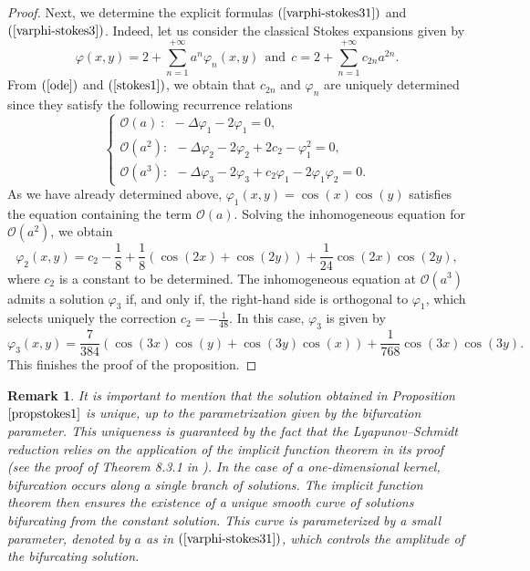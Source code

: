\documentclass[12pt,reqno,a4paper]{amsart} %
\numberwithin{equation}{section}
\numberwithin{figure}{section}
\newtheorem{remark}[theorem]{Remark}
\begin{document}
\begin{proof}
			 Next, we determine the explicit formulas $(\ref{varphi-stokes31})$ and $(\ref{varphi-stokes3})$. Indeed, let us consider the classical Stokes expansions given by
			 \begin{equation}\label{stokes1}\varphi(x,y) =2+\sum_{n=1}^{+\infty}a^n\varphi_n(x,y)\ \ \mbox{and}\ \ c = 2+ \sum_{n=1}^{+\infty}c_{2n}a^{2n}.\end{equation}
			 From $(\ref{ode})$ and $(\ref{stokes1})$, we obtain that $c_{2n}$ and $\varphi_n$ are uniquely determined since they satisfy the following recurrence relations
			 \begin{equation}\label{recurrence}\left\{\begin{array}{llllll}
			 	\mathcal{O}(a)\ :\ \ -\Delta\varphi_1-2\varphi_1=0,\\
			 	\mathcal{O}(a^2):\ \ - \Delta \varphi_2-2\varphi_2+2c_2-\varphi_1^2=0,\\
			 	\mathcal{O}(a^3):\ \ -\Delta\varphi_3-2\varphi_3+c_2\varphi_1-2\varphi_1\varphi_2=0.
			 	\end{array}\right.\end{equation}
			\indent As we have already determined above, $\varphi_1(x,y)=\cos(x)\cos(y)$ satisfies the equation containing the term $\mathcal{O}(a)$. Solving the inhomogeneous equation for $\mathcal{O}(a^2)$, we obtain
			\begin{equation}\label{stokes2}\varphi_2(x,y)=c_2-\frac{1}{8}+\frac{1}{8}\left(\cos(2x)+\cos(2y)\right)+\frac{1}{24}\cos(2x)\cos(2y),
			\end{equation} 
			where $c_2$ is a constant to be determined. The inhomogeneous equation at $\mathcal{O}(a^3)$ admits a solution $\varphi_3$ if, and only if, the right-hand side is orthogonal to $\varphi_1$, which selects uniquely the
			correction $c_2=-\frac{1}{48}$. In this case, $\varphi_3$ is given by
			 \begin{equation}\label{stokes3}\varphi_3(x,y)=\frac{7}{384}\left(\cos(3x)\cos(y)+\cos(3y)\cos(x)\right)+\frac{1}{768}\cos(3x)\cos(3y).
			 \end{equation} 
			 This finishes the proof of the proposition.	
				
			\end{proof}

\begin{remark}\label{remunique}
It is important to mention that the solution obtained in Proposition $\ref{propstokes1}$ is unique, up to the parametrization given by the bifurcation parameter. This uniqueness is guaranteed by the fact that the Lyapunov–Schmidt reduction relies on the application of the implicit function theorem in its proof (see the proof of Theorem 8.3.1 in \cite{buffoni-toland}). In the case of a one-dimensional kernel, bifurcation occurs along a single branch of solutions. The implicit function theorem then ensures the existence of a unique smooth curve of solutions bifurcating from the constant solution. This curve is parameterized by a small parameter, denoted by $a$ as in $(\ref{varphi-stokes31})$, which controls the amplitude of the bifurcating solution.


	
\end{remark}
\end{document}
